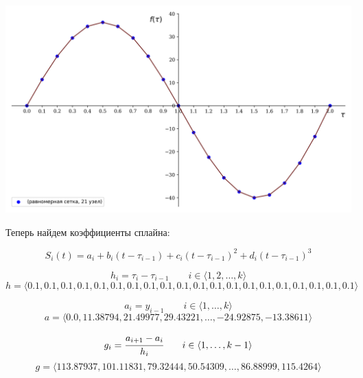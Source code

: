 \documentclass[a4paper, 14pt]{extarticle}
\begin{document}
\begin{center}
    \includegraphics[width=1\textwidth]{main_func_20}
\end{center}

Теперь найдем коэффициенты сплайна:

\begin{equation}
    S_i(t) = a_i + b_i (t - \tau_{i-1}) + c_i (t - \tau_{i-1})^2 + d_i (t - \tau_{i-1})^3  
\end{equation}

\vspace{10pt}

\begin{equation}
    h_i = \tau_i - \tau_{i - 1} \qquad i \in \langle 1, 2, \dots, k \rangle 
\end{equation}
\begin{equation*}
    h = \langle 0.1, 0.1, 0.1, 0.1, 0.1, 0.1, 0.1, 0.1, 0.1, 0.1, 0.1, 0.1, 0.1, 0.1, 0.1, 0.1, 0.1, 0.1, 0.1, 0.1 \rangle 
\end{equation*}

\vspace{10pt}

\begin{equation}
    a_i = y_{i-1} \qquad i \in \langle 1, \dots, k \rangle 
\end{equation}
\begin{equation*}
    a = \langle 0.0, 11.38794, 21.49977, 29.43221, \dots, -24.92875, -13.38611 \rangle 
\end{equation*}

\vspace{10pt}

\begin{equation}
    g_i = \cfrac{a_{i+1} - a_i}{h_i} \qquad i \in \langle 1, \dots, k-1 \rangle  
\end{equation}
\begin{equation*}
    g = \langle 113.87937, 101.11831, 79.32444, 50.54309, \dots, 86.88999, 115.4264 \rangle 
\end{equation*}
\end{document}
